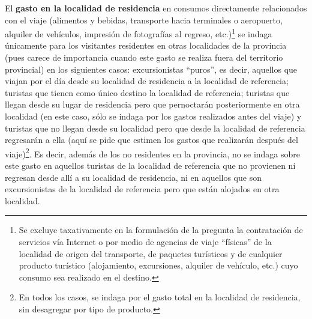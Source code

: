 \documentclass[
]{book}
\begin{document}
El \textbf{gasto en la localidad de residencia} en consumos directamente relacionados con el viaje (alimentos y bebidas, transporte hacia terminales o aeropuerto, alquiler de vehículos, impresión de fotografías al regreso, etc.)\footnote{Se excluye taxativamente en la formulación de la pregunta la contratación de servicios vía Internet o por medio de agencias de viaje ``físicas'' de la localidad de origen del transporte, de paquetes turísticos y de cualquier producto turístico (alojamiento, excursiones, alquiler de vehículo, etc.) cuyo consumo sea realizado en el destino.} se indaga únicamente para los visitantes residentes en otras localidades de la provincia (pues carece de importancia cuando este gasto se realiza fuera del territorio provincial) en los siguientes casos: excursionistas ``puros'', es decir, aquellos que viajan por el día desde su localidad de residencia a la localidad de referencia; turistas que tienen como único destino la localidad de referencia; turistas que llegan desde su lugar de residencia pero que pernoctarán posteriormente en otra localidad (en este caso, sólo se indaga por los gastos realizados antes del viaje) y turistas que no llegan desde su localidad pero que desde la localidad de referencia regresarán a ella (aquí se pide que estimen los gastos que realizarán después del viaje)\footnote{En todos los casos, se indaga por el gasto total en la localidad de residencia, sin desagregar por tipo de producto.}. Es decir, además de los no residentes en la provincia, no se indaga sobre este gasto en aquellos turistas de la localidad de referencia que no provienen ni regresan desde allí a su localidad de residencia, ni en aquellos que son excursionistas de la localidad de referencia pero que están alojados en otra localidad.
\end{document}
